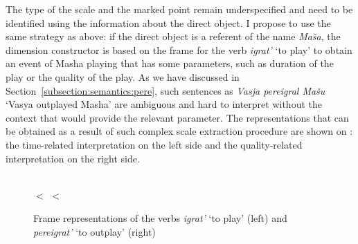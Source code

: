 The type of the scale and the marked point remain underspecified and need to be identified using the information about the direct object. I propose to use the same strategy as above: if the direct object is a referent of the name \textit{Ma\v{s}a}, the dimension constructor is based on the frame for the verb \textit{igrat'} `to play' to obtain an event of Masha playing that has some parameters, such as duration of the play or the quality of the play. As we have discussed in Section~\ref{subsection:semantics:pere}, such sentences as \textit{Vasja pereigral Ma\v{s}u} `Vasya outplayed Masha' are ambiguous and hard to interpret without the context   that would provide the relevant parameter. The representations that can be obtained as a result of such complex scale extraction procedure are shown on : the time-related interpretation on the left side and the quality-related interpretation on the right side.

\begin{figure}\small
\begin{minipage}{0.3\textwidth}
\end{minipage}\hfill%
\begin{minipage}{0.65\textwidth}\centering
{}\\
 $<$  $<$ 
\end{minipage}
\caption{Frame representations of the verbs \textit{igrat'} `to play' (left) and \textit{pereigrat'} `to outplay' (right) \label{frame:outplay}}
\end{figure}

